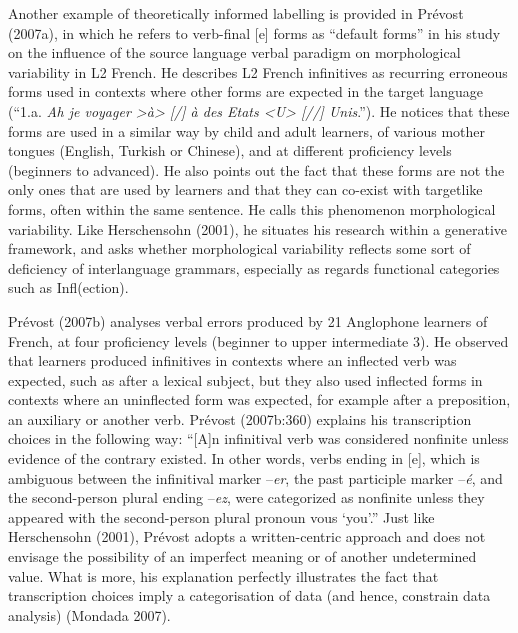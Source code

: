 \documentclass[11pt]{article}
\newenvironment{styleStandard}{\renewcommand\baselinestretch{1.0}\setlength\leftskip{0cm}\setlength\rightskip{0cm plus 1fil}\setlength\parindent{0cm}\setlength\parfillskip{0pt plus 1fil}\setlength\parskip{0in plus 1pt}\writerlistparindent\writerlistleftskip\leavevmode\normalfont\normalsize\writerlistlabel\ignorespaces}{\unskip\vspace{0.111in plus 0.0111in}\par}
\newcommand\writerlistleftskip{}
\newcommand\writerlistparindent{}
\newcommand\writerlistlabel{}
\begin{document}
\begin{styleStandard}
Another example of theoretically informed labelling is provided in Prévost (2007a), in which he refers to verb-final [e] forms as “default forms” in his study on the influence of the source language verbal paradigm on morphological variability in L2 French. He describes L2 French infinitives as recurring erroneous forms used in contexts where other forms are expected in the target language (“1.a. \textit{Ah je voyager {\textgreater}à{\textgreater} [/] à des Etats {\textless}U{\textgreater} [//] Unis}.”). He notices that these forms are used in a similar way by child and adult learners, of various mother tongues (English, Turkish or Chinese), and at different proficiency levels (beginners to advanced). He also points out the fact that these forms are not the only ones that are used by learners and that they can co-exist with targetlike forms, often within the same sentence. He calls this phenomenon morphological variability. Like Herschensohn (2001), he situates his research within a generative framework, and asks whether morphological variability reflects some sort of deficiency of interlanguage grammars, especially as regards functional categories such as Infl(ection). 
\end{styleStandard}

\begin{styleStandard}
Prévost (2007b) analyses verbal errors produced by 21 Anglophone learners of French, at four proficiency levels (beginner to upper intermediate 3). He observed that learners produced infinitives in contexts where an inflected verb was expected, such as after a lexical subject, but they also used inflected forms in contexts where an uninflected form was expected, for example after a preposition, an auxiliary or another verb. Prévost (2007b:360) explains his transcription choices in the following way: “[A]n infinitival verb was considered nonfinite unless evidence of the contrary existed. In other words, verbs ending in [e], which is ambiguous between the infinitival marker –\textit{er}, the past participle marker –\textit{é}, and the second-person plural ending –\textit{ez}, were categorized as nonfinite unless they appeared with the second-person plural pronoun vous ‘you’.” Just like Herschensohn (2001), Prévost adopts a written-centric approach and does not envisage the possibility of an imperfect meaning or of another undetermined value. What is more, his explanation perfectly illustrates the fact that transcription choices imply a categorisation of data (and hence, constrain data analysis) (Mondada 2007).
\end{styleStandard}
\end{document}
